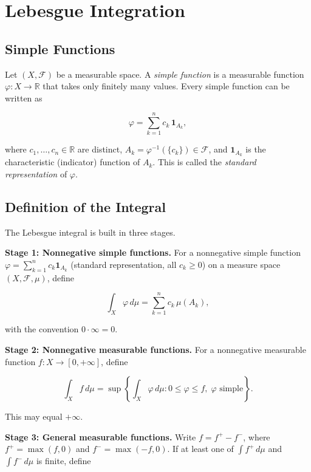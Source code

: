 \section{Lebesgue Integration}\label{sec:7.4}

\subsection{Simple Functions}\label{sec:7.4.1}

\begin{definition}\label{def:7.19.}
Let $(X, \mathcal{F})$ be a measurable space. A \textit{simple function} is a measurable function $\varphi: X \to \mathbb{R}$ that takes only finitely many values. Every simple function can be written as

\[
\varphi = \sum_{k=1}^{n} c_k \, \mathbf{1}_{A_k},
\]

where $c_1, \ldots, c_n \in \mathbb{R}$ are distinct, $A_k = \varphi^{-1}(\{c_k\}) \in \mathcal{F}$, and $\mathbf{1}_{A_k}$ is the characteristic (indicator) function of $A_k$. This is called the \textit{standard representation} of $\varphi$.
\end{definition}


\subsection{Definition of the Integral}\label{sec:7.4.2}

The Lebesgue integral is built in three stages.

\textbf{Stage 1: Nonnegative simple functions.} For a nonnegative simple function $\varphi = \sum_{k=1}^n c_k \mathbf{1}_{A_k}$ (standard representation, all $c_k \geq 0$) on a measure space $(X, \mathcal{F}, \mu)$, define

\[
\int_X \varphi \, d\mu = \sum_{k=1}^{n} c_k \, \mu(A_k),
\]

with the convention $0 \cdot \infty = 0$.

\textbf{Stage 2: Nonnegative measurable functions.} For a nonnegative measurable function $f: X \to [0, +\infty]$, define

\[
\int_X f \, d\mu = \sup\!\left\{ \int_X \varphi \, d\mu : 0 \leq \varphi \leq f, \; \varphi \text{ simple} \right\}.
\]

This may equal $+\infty$.

\textbf{Stage 3: General measurable functions.} Write $f = f^+ - f^-$, where $f^+ = \max(f, 0)$ and $f^- = \max(-f, 0)$. If at least one of $\int f^+ \, d\mu$ and $\int f^- \, d\mu$ is finite, define

